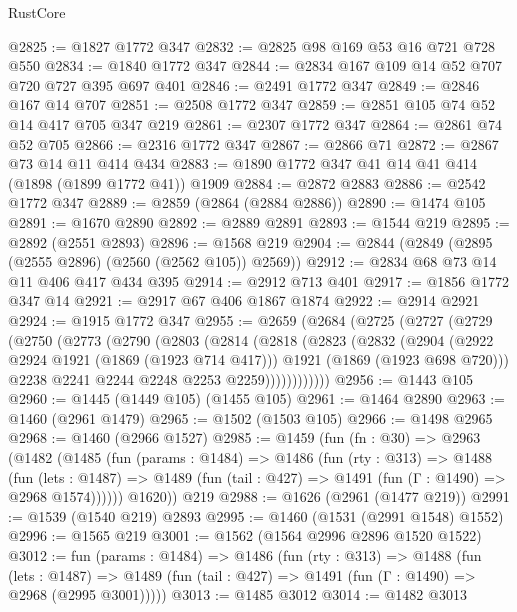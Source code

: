 \begin{lexlean}{RustCore}
\begin{coremodule}
@2825 := @1827 @1772 @347
@2832 := @2825 @98 @169 @53 @16 @721 @728 @550
@2834 := @1840 @1772 @347
@2844 := @2834 @167 @109 @14 @52 @707 @720 @727 @395 @697 @401
@2846 := @2491 @1772 @347
@2849 := @2846 @167 @14 @707
@2851 := @2508 @1772 @347
@2859 := @2851 @105 @74 @52 @14 @417 @705 @347 @219
@2861 := @2307 @1772 @347
@2864 := @2861 @74 @52 @705
@2866 := @2316 @1772 @347
@2867 := @2866 @71
@2872 := @2867 @73 @14 @11 @414 @434
@2883 := @1890 @1772 @347 @41 @14 @41 @414 (@1898 (@1899 @1772 @41)) @1909
@2884 := @2872 @2883
@2886 := @2542 @1772 @347
@2889 := @2859 (@2864 (@2884 @2886))
@2890 := @1474 @105
@2891 := @1670 @2890
@2892 := @2889 @2891
@2893 := @1544 @219
@2895 := @2892 (@2551 @2893)
@2896 := @1568 @219
@2904 := @2844 (@2849 (@2895 (@2555 @2896) (@2560 (@2562 @105)) @2569))
@2912 := @2834 @68 @73 @14 @11 @406 @417 @434 @395
@2914 := @2912 @713 @401
@2917 := @1856 @1772 @347 @14
@2921 := @2917 @67 @406 @1867 @1874
@2922 := @2914 @2921
@2924 := @1915 @1772 @347
@2955 := @2659
    (@2684
      (@2725
        (@2727
          (@2729
            (@2750
              (@2773
                (@2790
                  (@2803
                    (@2814
                      (@2818
                        (@2823
                          (@2832
                            (@2904
                              (@2922 @2924 @1921 (@1869 (@1923 @714 @417)))
                              @1921
                              (@1869 (@1923 @698 @720)))
                            @2238
                            @2241
                            @2244
                            @2248
                            @2253
                            @2259))))))))))))
@2956 := @1443 @105
@2960 := @1445 (@1449 @105) (@1455 @105)
@2961 := @1464 @2890
@2963 := @1460 (@2961 @1479)
@2965 := @1502 (@1503 @105)
@2966 := @1498 @2965
@2968 := @1460 (@2966 @1527)
@2985 := @1459
    (fun (fn : @30) =>
    @2963
      (@1482
        (@1485
          (fun (params : @1484) =>
          @1486
            (fun (rty : @313) =>
            @1488
              (fun (lets : @1487) =>
              @1489 (fun (tail : @427) => @1491 (fun (Γ : @1490) => @2968 @1574))))))
        @1620))
    @219
@2988 := @1626 (@2961 (@1477 @219))
@2991 := @1539 (@1540 @219) @2893
@2995 := @1460 (@1531 (@2991 @1548) @1552)
@2996 := @1565 @219
@3001 := @1562 (@1564 @2996 @2896 @1520 @1522)
@3012 := fun (params : @1484) =>
  @1486
    (fun (rty : @313) =>
    @1488
      (fun (lets : @1487) =>
      @1489 (fun (tail : @427) => @1491 (fun (Γ : @1490) => @2968 (@2995 @3001)))))
@3013 := @1485 @3012
@3014 := @1482 @3013

\end{coremodule}
\end{lexlean}

